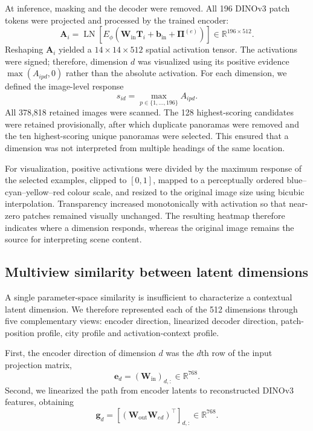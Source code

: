 At inference, masking and the decoder were removed. All 196 DINOv3 patch tokens
were projected and processed by the trained encoder:
\begin{equation}
  \mathbf{A}_i
  = \operatorname{LN}\!\left[
      E_{\phi}(\mathbf{W}_{\mathrm{in}}\mathbf{T}_i
      +\mathbf{b}_{\mathrm{in}}+\boldsymbol{\Pi}^{(e)})
    \right]
  \in \mathbb{R}^{196\times512}.
  \label{eq:full_encoding}
\end{equation}
Reshaping $\mathbf{A}_i$ yielded a
$14\times14\times512$ spatial activation tensor. The activations were signed;
therefore, dimension $d$ was visualized using its positive evidence
$\max(A_{ipd},0)$ rather than the absolute activation. For each dimension, we
defined the image-level response
\begin{equation}
  s_{id}=\max_{p\in\{1,\ldots,196\}} A_{ipd}.
  \label{eq:image_response}
\end{equation}
All 378,818 retained images were scanned. The 128 highest-scoring candidates
were retained provisionally, after which duplicate panoramas were removed and
the ten highest-scoring unique panoramas were selected. This ensured that a
dimension was not interpreted from multiple headings of the same location.

For visualization, positive activations were divided by the maximum response of
the selected examples, clipped to $[0,1]$, mapped to a perceptually ordered
blue--cyan--yellow--red colour scale, and resized to the original image size
using bicubic interpolation. Transparency increased monotonically with
activation so that near-zero patches remained visually unchanged. The resulting
heatmap therefore indicates where a dimension responds, whereas the original
image remains the source for interpreting scene content.

\subsection{Multiview similarity between latent dimensions}
\label{sec:multiview_similarity}

A single parameter-space similarity is insufficient to characterize a contextual
latent dimension. We therefore represented each of the 512 dimensions through
five complementary views: encoder direction, linearized decoder direction,
patch-position profile, city profile and activation-context profile.

First, the encoder direction of dimension $d$ was the $d$th row of the input
projection matrix,
\begin{equation}
  \mathbf{e}_d = (\mathbf{W}_{\mathrm{in}})_{d,:}
  \in\mathbb{R}^{768}.
  \label{eq:encoder_direction}
\end{equation}
Second, we linearized the path from encoder latents to reconstructed DINOv3
features, obtaining
\begin{equation}
  \mathbf{g}_d
  = \left[
      (\mathbf{W}_{\mathrm{out}}\mathbf{W}_{ed})^{\top}
    \right]_{d,:}
  \in\mathbb{R}^{768}.
  \label{eq:decoder_direction}
\end{equation}

